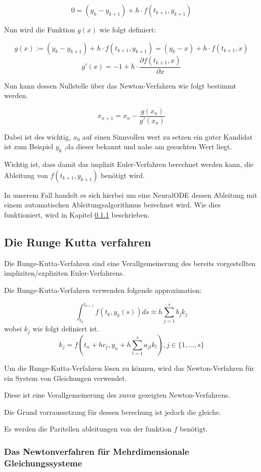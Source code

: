 $$
0 = (y_k - y_{k + 1})  + h \cdot f(t_{k + 1}, y_{k + 1})
$$

Nun wird die Funktion $g(x)$ wie folgt definiert:

$$
g(x) := (y_k - y_{k + 1})  + h \cdot f(t_{k + 1}, y_{k + 1}) = (y_k - x)  + h \cdot f(t_{k + 1}, x)
$$
$$
g'(x) = -1 + h \cdot \frac{\partial f(t_{k+1}, x)}{\partial x}
$$

Nun kann dessen Nullstelle über das Newton-Verfahren wie folgt bestimmt werden.

$$
x_{n+1} = x_{n} - \frac{g(x_n)}{g'(x_n)}
$$

Dabei ist des wichtig, $x_{0}$ auf einen Sinnvollen wert zu setzen ein guter Kandidat ist zum Beispiel
$y_{k}$ ,da dieser bekannt und nahe am gesuchten Wert liegt.

Wichtig ist, dass damit das implizit Euler-Verfahren berechnet werden kann, die Ableitung von $f(t_{k + 1}, y_{k + 1})$ benötigt wird.

In unserem Fall handelt es sich hierbei um eine NeuralODE dessen Ableitung mit einem automatischen Ableitungsalgorithmus berechnet wird. Wie dies funktioniert, wird in Kapitel \ref{} beschrieben.

\subsection{Die Runge Kutta verfahren} \label{sec:runge_kutta}

Die Runge-Kutta-Verfahren sind eine Verallgemeinerung des
bereits vorgestellten impliziten/expliziten Euler-Verfahrens.

Die Runge-Kutta-Verfahren verwenden folgende approximation:

$$
\int_{t_k}^{t_{k+1}} f(t_k, y_k(s)) ds \approx h \sum_{j=1}^{s} b_j k_j
$$
wobei $k_j$ wie folgt definiert ist.
$$
k_j = f(t_n + h c_j, y_n + h \sum_{l=1}^{s}a_{jl}k_{l}) , j \in \{1, ..., s\}
$$


Um die Runge-Kutta-Verfahren lösen zu können, wird das Newton-Verfahren für ein 
System von Gleichungen verwendet.

Diese ist eine Verallgemeinerung des zuvor gezeigten Newton-Verfahrens.

Die Grund vorraussetzung für dessen berechung ist jedoch die gleiche.

Es werden die Paritellen ableitungen von der funktion 
$f$ benötigt.

\subsubsection{Das Newtonverfahren für Mehrdimensionale Gleichungssysteme}

